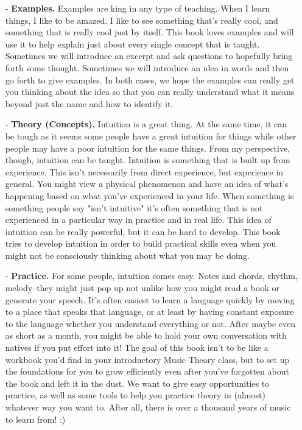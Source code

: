 \documentclass[../OpenAppliedMusicTheory.tex]{subfiles}
\begin{document}
    \begin{itemize}
        \item[-] \textbf{Examples.} Examples are king in any type of teaching. When I learn things, I like to be amazed. I like to see something that's really cool, and something that is really cool just by itself. This book loves examples and will use it to help explain just about every single concept that is taught. Sometimes we will introduce an excerpt and ask questions to hopefully bring forth some thought. Sometimes we will introduce an idea in words and then go forth to give examples. In both cases, we hope the examples can really get you thinking about the idea so that you can really understand what it means beyond just the name and how to identify it.
        \item[-] \textbf{Theory (Concepts).} Intuition is a great thing. At the same time, it can be tough as it seems some people have a great intuition for things while other people may have a poor intuition for the same things. From my perspective, though, intuition can be taught. Intuition is something that is built up from experience. This isn't necessarily from direct experience, but experience in general. You might view a physical phenomenon and have an idea of what's happening based on what you've experienced in your life. When something is something people say "isn't intuitive" it's often something that is not experienced in a particular way in practice and in real life. This idea of intuition can be really powerful, but it can be hard to develop. This book tries to develop intuition in order to build practical skills even when you might not be consciously thinking about what you may be doing.
        \item[-] \textbf{Practice.} For some people, intuition comes easy. Notes and chords, rhythm, melody--they might just pop up not unlike how you might read a book or generate your speech. It's often easiest to learn a language quickly by moving to a place that speaks that language, or at least by having constant exposure to the language whether you understand everything or not. After maybe even as short as a month, you might be able to hold your own conversation with natives if you put effort into it! The goal of this book isn't to be like a workbook you'd find in your introductory Music Theory class, but to set up the foundations for you to grow efficiently even after you've forgotten about the book and left it in the dust. We want to give easy opportunities to practice, as well as some tools to help you practice theory in (almost) whatever way you want to. After all, there is over a thousand years of music to learn from! :) 
    \end{itemize}
\end{document}
